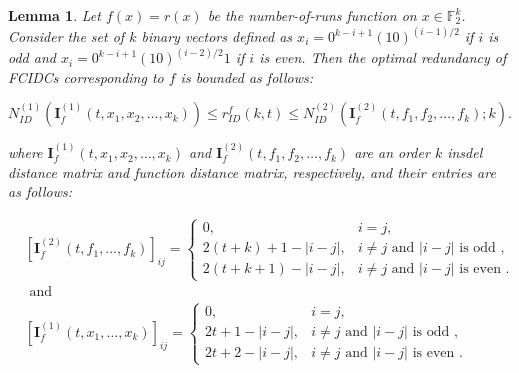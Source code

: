 \documentclass[11 pt]{article}
\numberwithin{equation}{section}
\newtheorem{lemma}[theorem]{Lemma}
\begin{document}
    \begin{lemma}\label{runs_bound}
        Let $f(x) = r(x)$ be the number-of-runs function on $x \in \mathbb{F}_2^k$. Consider the set of $k$ binary vectors defined as $x_i = 0^{k-i+1}(10)^{(i-1)/2}$ if $i$ is odd and $x_i = 0^{k-i+1}(10)^{(i-2)/2}1$ if $i$ is even. Then the optimal redundancy of FCIDCs corresponding to $f$ is bounded as follows:
        
        \[
             N^{(1)}_{ID}(\bm{I}_f^{(1)}(t, x_1,x_2,\dots,x_k)) \leq r_{ID}^f(k,t) \leq N^{(2)}_{ID}(\bm{I}_f^{(2)}(t, f_1,f_2,\dots,f_k);k).
        \]           
                    
            where $\bm{I}_f^{(1)}(t, x_1,x_2,\dots,x_k)$ and $\bm{I}_f^{(2)}(t, f_1,f_2,\dots,f_k)$ are an order $k$ insdel distance matrix and function distance matrix, respectively, and their entries are as follows:
           
            \begin{align*}
            &[\bm{I}_f^{(2)}(t, f_1, \ldots, f_{k})]_{ij} =
            \begin{cases}
                0,      & i = j, \\[4pt]
                2(t + k) + 1 - |i-j|, & i \neq j \text{ and } |i-j| \text{ is odd }, \\
                2(t + k + 1) - |i-j|, & i \neq j \text{ and } |i-j| \text{ is even }.
            \end{cases}\\           
            &\text{ and }\\
            &[\bm{I}_{f}^{(1)}(t, x_1, \ldots, x_{k})]_{ij} =
            \begin{cases}
                0,  & i = j, \\[4pt]
                2t + 1 - |i - j| , & i \neq j \text{ and } |i-j| \text{ is odd },\\
                2t + 2 - |i-j|,    & i \neq j \text{ and } |i-j| \text{ is even }. 
            \end{cases}
            \end{align*}
            
    \end{lemma}
\end{document}
